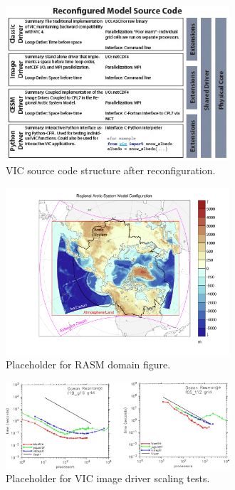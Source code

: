 \documentclass[gmd, manuscript]{copernicus}
\begin{document}
\clearpage
\begin{figure}[t]
\includegraphics[width=8.3cm]{VIC_config.jpg}
\caption{VIC source code structure after reconfiguration. }
\label{fig:vic_config}
\end{figure}

%
%
\clearpage
\begin{figure}[t]
\includegraphics[width=8.3cm]{RASM_Domain.png}
\caption{Placeholder for RASM domain figure.}
\label{fig:vic_domain}
\end{figure}

\clearpage
\begin{figure}[t]
\includegraphics[width=8.3cm]{VIC_scaling.jpg}
\caption{Placeholder for VIC image driver scaling tests.}
\label{fig:vic_scaling}
\end{figure}
\end{document}
